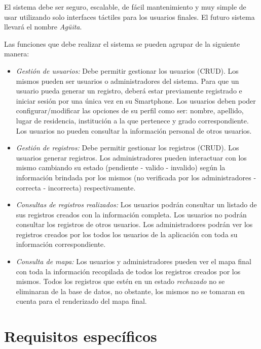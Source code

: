      El sistema debe ser seguro, escalable, de fácil mantenimiento y muy simple de usar utilizando solo interfaces táctiles para los usuarios finales. El futuro sistema llevará el nombre \emph{Agüita}.

      Las funciones que debe realizar el sistema se pueden agrupar de la siguiente manera:

      \begin{itemize}

        \item \emph{Gestión de usuarios:} Debe permitir gestionar los usuarios (CRUD). Los mismos pueden ser usuarios o administradores del sistema.
        Para que un usuario pueda generar un registro, deberá estar previamente registrado e iniciar sesión por una única vez en su Smartphone.
        Los usuarios deben poder configurar/modificar las opciones de su perfil como ser: nombre, apellido, lugar de residencia, institución a la que pertenece y grado correspondiente.
        Los usuarios no pueden consultar la información personal de otros usuarios.

        \item \emph{Gestión de registros:} Debe permitir gestionar los registros (CRUD). Los usuarios generar registros. Los administradores pueden interactuar con los mismo cambiando su estado (pendiente - valido - invalido) según la información brindada por los mismos (no verificada por los administradores - correcta - incorrecta) respectivamente.

        \item \emph{Consultas de registros realizados:} Los usuarios podrán consultar un listado de sus registros creados con la información completa.
        Los usuarios no podrán consultar los registros de otros usuarios.
        Los administradores podrán ver los registros creados por los todos los usuarios de la aplicación con toda su información correspondiente.

        \item \emph{Consulta de mapa:} Los usuarios y administradores pueden ver el mapa final con toda la información recopilada de todos los registros creados por los mismos.
        Todos los registros que estén en un estado \emph{rechazado} no se eliminaran de la base de datos, no obstante, los mismos no se tomaran en cuenta para el renderizado del mapa final. 

      \end{itemize}

  \section{Requisitos específicos}

